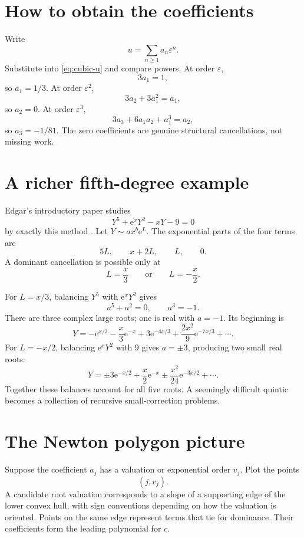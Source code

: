 \documentclass[11pt,openany]{book}
\theoremstyle{definition}
\theoremstyle{plain}
\theoremstyle{remark}
\newcommand{\eps}{\varepsilon}
\newcommand{\e}{\mathrm{e}}
\newcommand{\asym}{\sim}
\begin{document}
\section{How to obtain the coefficients}

Write
\[
 u=\sum_{n\ge1}a_n\eps^n.
\]
Substitute into \cref{eq:cubic-u} and compare powers. At order $\eps$,
\[
 3a_1=1,
\]
so $a_1=1/3$. At order $\eps^2$,
\[
 3a_2+3a_1^2=a_1,
\]
so $a_2=0$. At order $\eps^3$,
\[
 3a_3+6a_1a_2+a_1^3=a_2,
\]
so $a_3=-1/81$. The zero coefficients are genuine structural cancellations, not missing work.

\section{A richer fifth-degree example}

Edgar's introductory paper studies
\begin{equation}\label{eq:Edgar-quintic}
 Y^5+\e^xY^2-xY-9=0
\end{equation}
by exactly this method \cite{edgar-beginners}. Let $Y\asym ax^b\e^L$. The exponential parts of the four terms are
\[
 5L,
 \qquad x+2L,
 \qquad L,
 \qquad0.
\]
A dominant cancellation is possible only at
\[
 L=\frac{x}{3}
 \qquad\text{or}\qquad
 L=-\frac{x}{2}.
\]

For $L=x/3$, balancing $Y^5$ with $\e^xY^2$ gives
\[
 a^5+a^2=0,
 \qquad a^3=-1.
\]
There are three complex large roots; one is real with $a=-1$. Its beginning is
\begin{equation}\label{eq:Edgar-large-root}
 Y=-\e^{x/3}-\frac{x}{3}\e^{-x}
 +3\e^{-4x/3}+\frac{2x^2}{9}\e^{-7x/3}+\cdots.
\end{equation}
For $L=-x/2$, balancing $\e^xY^2$ with $9$ gives $a=\pm3$, producing two small real roots:
\begin{equation}\label{eq:Edgar-small-roots}
 Y=\pm3\e^{-x/2}+\frac{x}{2}\e^{-x}
 \pm\frac{x^2}{24}\e^{-3x/2}+\cdots.
\end{equation}
Together these balances account for all five roots. A seemingly difficult quintic becomes a collection of recursive small-correction problems.

\section{The Newton polygon picture}

Suppose the coefficient $a_j$ has a valuation or exponential order $v_j$. Plot the points
\[
 (j,v_j).
\]
A candidate root valuation corresponds to a slope of a supporting edge of the lower convex hull, with sign conventions depending on how the valuation is oriented. Points on the same edge represent terms that tie for dominance. Their coefficients form the leading polynomial for $c$.
\end{document}
